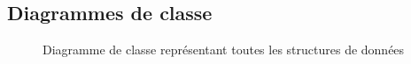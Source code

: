 \documentclass[a4paper]{report}
\begin{document}
\subsection{Diagrammes de classe}

\newpage
\begin{figure}[H]
    \vspace*{-3cm}
    \caption{\label{3} Diagramme de classe représentant toutes les structures de données}
\end{figure}
\newpage
\end{document}
